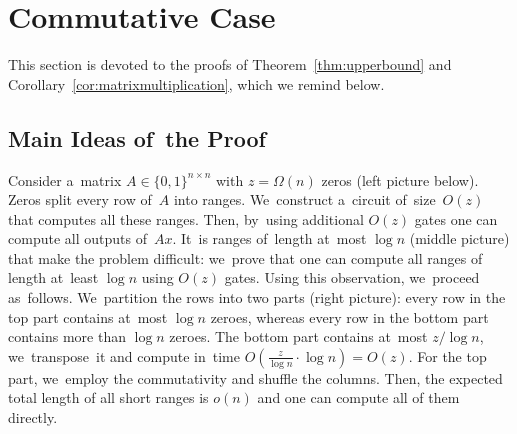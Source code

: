 \documentclass{toc}
\begin{document}

\section{Commutative Case}\label{sec-commutative}

This section is devoted to the proofs of Theorem~\ref{thm:upperbound} and
Corollary~\ref{cor:matrixmultiplication}, which we remind below.

\upperthm*

\matrixmultcor*

\subsection{Main Ideas of~the Proof}


Consider a~matrix $A \in \{0,1\}^{n \times n}$
with $z=\Omega(n)$ zeros (left picture below).
Zeros split every row of~$A$ into ranges.
We~construct a~circuit of~size~$O(z)$ that computes all these ranges. Then, by~using additional $O(z)$ gates one can
compute all outputs of~$Ax$. It~is ranges of~length at~most $\log n$ (middle picture) that make the problem difficult:
we~prove that one can compute
all ranges of length at~least $\log n$ using $O(z)$ gates.
Using this observation, we~proceed as~follows.
We~partition the rows into two parts (right picture): every row in the top part contains at~most $\log n$ zeroes, whereas every row in the bottom part contains more than $\log n$ zeroes. The bottom part contains at~most $z/\log n$, we~transpose~it and compute in~time $O(\frac{z}{\log n} \cdot \log n)=O(z)$. For the top part, we~employ the commutativity and shuffle the columns. Then, the expected total length of all short ranges is $o(n)$ and one can
compute all of them directly.
\end{document}
